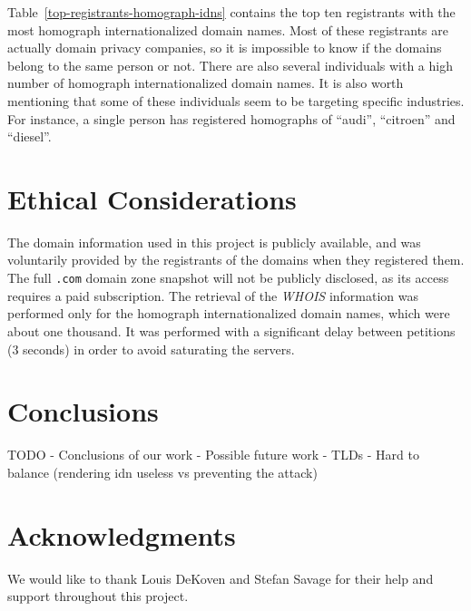 \documentclass[letterpaper,twocolumn,10pt]{article}
\begin{document}
Table~\ref{top-registrants-homograph-idns} contains the top ten registrants with the most homograph internationalized domain names.
Most of these registrants are actually domain privacy companies, so it is impossible to know if the domains belong to the same person or not.
There are also several individuals with a high number of homograph internationalized domain names.
It is also worth mentioning that some of these individuals seem to be targeting specific industries.
For instance, a single person has registered homographs of ``audi'', ``citroen'' and ``diesel''.

\section{Ethical Considerations}
The domain information used in this project is publicly available, and was voluntarily provided by the registrants of the domains when they registered them.
The full \texttt{.com} domain zone snapshot will not be publicly disclosed, as its access requires a paid subscription.
The retrieval of the \textit{WHOIS} information was performed only for the homograph internationalized domain names, which were about one thousand.
It was performed with a significant delay between petitions (3 seconds) in order to avoid saturating the servers.

\section{Conclusions}
TODO
- Conclusions of our work
- Possible future work
- TLDs
- Hard to balance (rendering idn useless vs preventing the attack)

\section*{Acknowledgments}
We would like to thank Louis DeKoven and Stefan Savage for their help and support throughout this project.

\clearpage

{\footnotesize 
}

\theendnotes
\end{document}
